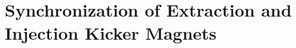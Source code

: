 %
%
%
%
%

%
%

\section{Synchronization of Extraction and Injection Kicker Magnets}
\label{sec:kicker}

